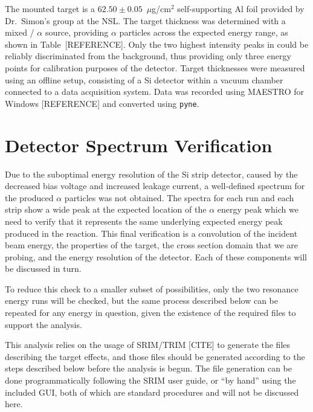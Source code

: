 

The mounted target is a $62.50\pm0.05$~$\mu$g/cm$^2$ self-supporting Al foil
provided by Dr.\ Simon's group at the NSL. The target thickness was determined
with a mixed / $\alpha$ source, providing $\alpha$
particles across the expected energy range, as shown in Table~[REFERENCE].
Only the two highest intensity peaks in  could be reliably
discriminated from the background, thus providing only three energy points for
calibration purposes of the detector. Target thicknesses were measured using an
offline setup, consisting of a Si detector within a vacuum chamber connected to
a data acquisition system. Data was recorded using MAESTRO for Windows
[REFERENCE] and converted using \texttt{pyne}.




\section{Detector Spectrum
Verification}\label{detector-spectrum-verification}

Due to the suboptimal energy resolution of the Si strip detector, caused
by the decreased bias voltage and increased leakage current, a
well-defined spectrum for the produced $\alpha$ particles was not
obtained. The spectra for each run and each strip show a wide peak at
the expected location of the $\alpha$ energy peak which we need to
verify that it represents the same underlying expected energy peak
produced in the reaction. This final verification is a convolution of
the incident beam energy, the properties of the target, the cross
section domain that we are probing, and the energy resolution of the
detector. Each of these components will be discussed in turn.

To reduce this check to a smaller subset of possibilities, only the two
resonance energy runs will be checked, but the same process described
below can be repeated for any energy in question, given the existence of
the required files to support the analysis.

This analysis relies on the usage of SRIM/TRIM [CITE] to generate
the files describing the target effects, and those files should be
generated according to the steps described below before the analysis is
begun. The file generation can be done programmatically following the
SRIM user guide, or ``by hand'' using the included GUI, both of which
are standard procedures and will not be discussed here.


